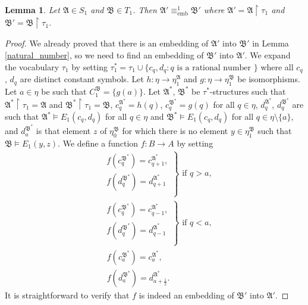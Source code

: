 \documentclass{ndjflart}
\theoremstyle{plain}
\newtheorem{lemma}[conjecture]{Lemma}
\theoremstyle{definition}
\numberwithin{equation}{section}
\DeclareMathOperator{\emb}{emb}
\begin{document}
\begin{lemma}\label{we_have}
Let $\mathfrak{A} \in S_1$ and $\mathfrak{B} \in T_1$. Then $\mathfrak{A}' \equiv_{\emb}^1 \mathfrak{B}'$ where $\mathfrak{A}' = \mathfrak{A}\upharpoonright \tau_1$ and $\mathfrak{B}' = \mathfrak{B}\upharpoonright \tau_1$.
\end{lemma}
\begin{proof}
We already proved that there is an embedding of $\mathfrak{A}'$ into $\mathfrak{B}'$ in Lemma \ref{natural_number}, so we need to find an embedding of $\mathfrak{B}'$ into $\mathfrak{A}'$.
We expand the vocabulary $\tau_1$ by setting $\tau^*_1 = \tau_1 \cup \{c_q,d_q \colon q \text{ is a rational number } \}$ where all $c_q$, $d_q$ are distinct constant symbols. Let $h \colon \eta \rightarrow \eta^{\mathfrak{A}}_1$ and $g \colon \eta \rightarrow \eta^{\mathfrak{B}}_1$ be isomorphisms.
Let $a \in \eta$ be such that $C^{\mathfrak{B}}_1 = \{g(a)\}$.
Let $\mathfrak{A}^*$, $\mathfrak{B}^*$ be $\tau^*$-structures such that $\mathfrak{A}^* \upharpoonright \tau_1 = \mathfrak{A}$ and $\mathfrak{B}^*\upharpoonright \tau_1 = \mathfrak{B}$, $c^{\mathfrak{A}^*}_q = h(q)$, $c^{\mathfrak{B}^*}_q = g(q)$ for all $q\in \eta$, $d_q^{\mathfrak{A}^*}$, $d_q^{\mathfrak{B}^*}$ are such that $\mathfrak{A}^* \vDash E_1(c_q, d_q)$ for all $q \in \eta$ and $\mathfrak{B}^* \vDash E_1(c_q, d_q)$ for all $q \in \eta \setminus \{a\}$, and $d_a^{\mathfrak{B}^*}$ is that element $z$ of $\eta_0^{\mathfrak{B}}$ for which there is no element $y \in \eta_1^{\mathfrak{B}}$ such that $\mathfrak{B} \vDash E_1(y, z)$.
We define a function $f \colon B \rightarrow A$ by setting
\begin{align*}
	&\left. \begin{array}{rl}
		f(c_q^{\mathfrak{B}^*}) = c_{q+1}^{\mathfrak{A}^*}, \\
		f(d_q^{\mathfrak{B}^*}) = d_{q+1}^{\mathfrak{A}^*} \\
		\end{array} \right\} \text{ if } q > a, \\
	&\left. \begin{array}{rl}
		f(c_q^{\mathfrak{B}^*}) = c_{q-1}^{\mathfrak{A}^*}, \\
		f(d_q^{\mathfrak{B}^*}) = d_{q-1}^{\mathfrak{A}^*} \\
		\end{array} \right\} \text{ if } q < a,\\
	&\ \ f(c^{\mathfrak{B}^*}_a) = c^{\mathfrak{A}^*}_a, \\
	&\ \ f(d^{\mathfrak{B}^*}_a) = d^{\mathfrak{A}^*}_{a+\frac{1}{2}}.
\end{align*}
It is straightforward to verify that $f$ is indeed an embedding of $\mathfrak{B}'$ into $\mathfrak{A}'$.
\end{proof}
\end{document}
